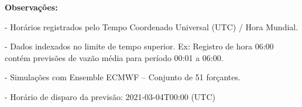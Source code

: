 \documentclass[]{article}
\begin{document}
\textbf{Observações:}

- Horários registrados pelo Tempo Coordenado Universal (UTC) / Hora
Mundial.

- Dados indexados no limite de tempo superior. Ex: Registro de hora
06:00 contém previsões de vazão média para período 00:01 a 06:00.

- Simulações com Ensemble ECMWF -- Conjunto de 51 forçantes.

- Horário de disparo da previsão: 2021-03-04T00:00 (UTC)
\end{document}
